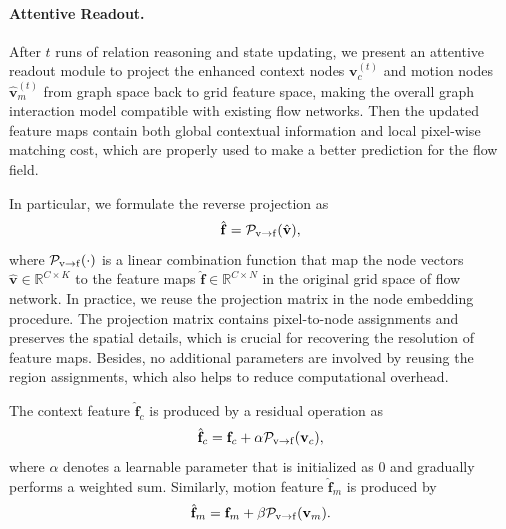 \documentclass[letterpaper]{article} %
\begin{document}
\paragraph{Attentive Readout.}

After $t$ runs of relation reasoning and state updating, we present an attentive readout module to project the enhanced context nodes ${\mathbf v}_c^{(t)}$ and motion nodes $\hat{\mathbf v}_m^{(t)}$ from graph space back to grid feature space, making the overall graph interaction model compatible with existing flow networks. Then the updated feature maps contain both global contextual information and local pixel-wise matching cost, which are properly used to make a better prediction for the flow field.

In particular, we formulate the reverse projection as
\begin{equation}
	\hat{\mathbf f} = {\cal P}_{{\mathrm v}\rightarrow {\mathrm f}}(\hat{\mathbf v}),
\end{equation}
where ${\cal P}_{{\mathrm v}\rightarrow {\mathrm f}}(\cdot)$ is a linear combination function that map the node vectors $\hat{\mathbf v} \in \mathbb{R}^{C \times K}$ to the feature maps $\hat{\mathbf f} \in \mathbb{R}^{C \times N}$ in the original grid space of flow network. In practice, we reuse the projection matrix in the node embedding procedure. The projection matrix contains pixel-to-node assignments and preserves the spatial details, which is crucial for recovering the resolution of feature maps. Besides, no additional parameters are involved by reusing the region assignments, which also helps to reduce computational overhead.

The context feature $\hat{\mathbf f}_c$ is produced by a residual operation as
\begin{equation}
	\hat{\mathbf f}_c = {\mathbf f}_c + \alpha {\cal P}_{{\mathrm v}\rightarrow {\mathrm f}}({\mathbf v}_c),
\end{equation}
where $\alpha$ denotes a learnable parameter that is initialized as $0$ and gradually performs a weighted sum. Similarly, motion feature $\hat{\mathbf f}_m$ is produced by
\begin{equation}
	\hat{\mathbf f}_m = {\mathbf f}_m + \beta {\cal P}_{{\mathrm v}\rightarrow {\mathrm f}}({\mathbf v}_m).
\end{equation}
\end{document}
